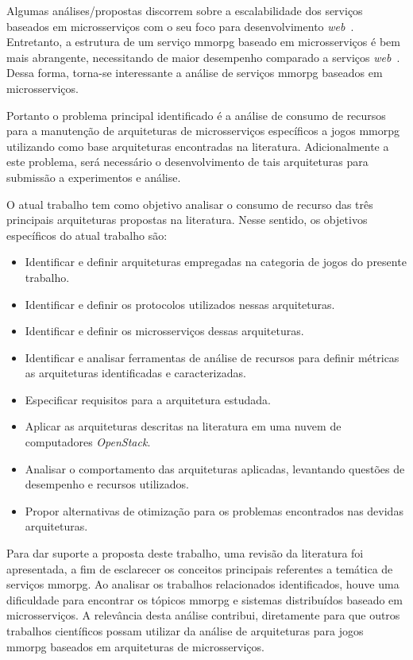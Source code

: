 Algumas análises/propostas discorrem sobre a escalabilidade dos serviços baseados em microsserviços com o seu foco para desenvolvimento \textit{web}~\cite{photon_engine, mmorpg_culture}.
%
Entretanto, a estrutura de um serviço \ac{mmorpg} baseado em microsserviços é bem mais abrangente, necessitando de maior desempenho comparado a serviços \textit{web}~\cite{photon_engine, mmorpg_culture}.
%
Dessa forma, torna-se interessante a análise de serviços \ac{mmorpg} baseados em microsserviços.



Portanto o problema principal identificado é a análise de consumo de recursos para a manutenção de arquiteturas de microsserviços específicos a jogos \ac{mmorpg} utilizando como base arquiteturas encontradas na literatura.
%
Adicionalmente a este problema, será necessário o desenvolvimento de tais arquiteturas para submissão a experimentos e análise.

O atual trabalho tem como objetivo analisar o consumo de recurso das três principais arquiteturas propostas na literatura.
%
Nesse sentido, os objetivos específicos do atual trabalho são:

\begin{itemize}
    \item Identificar e definir arquiteturas empregadas na categoria de jogos do presente trabalho.
    \item Identificar e definir os protocolos utilizados nessas arquiteturas.
    \item Identificar e definir os microsserviços dessas arquiteturas.
    \item Identificar e analisar ferramentas de análise de recursos para definir métricas as arquiteturas identificadas e caracterizadas.
    \item Especificar requisitos para a arquitetura estudada.
    \item Aplicar as arquiteturas descritas na literatura em uma nuvem de computadores \textit{OpenStack}.
    \item Analisar o comportamento das arquiteturas aplicadas, levantando questões de desempenho e recursos utilizados.
    \item Propor alternativas de otimização para os problemas encontrados nas devidas arquiteturas.
\end{itemize}


Para dar suporte a proposta deste trabalho, uma revisão da literatura foi apresentada, a fim de esclarecer os conceitos principais referentes a temática de serviços \ac{mmorpg}.
%
Ao analisar os trabalhos relacionados identificados, houve uma dificuldade para encontrar os tópicos \ac{mmorpg} e sistemas distribuídos baseado em microsserviços.
%
A relevância desta análise contribui, diretamente para que outros trabalhos científicos possam utilizar da análise de arquiteturas para jogos \ac{mmorpg} baseados em arquiteturas de microsserviços.



